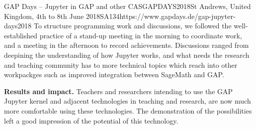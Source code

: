 \begin{event}{GAP Days -- Jupyter in GAP and other CAS}{GAPDAYS2018}{St Andrews, United Kingdom, 4th to 8th June 2018}{SA}{13}{4}{https://www.gapdays.de/gap-jupyter-days2018}
To structure programming work and discussions, we followed the well-established
practice of a stand-up meeting in the morning to coordinate work, and a meeting
in the afternoon to record achievements.
%
Discussions ranged from deepining the understanding of how Jupyter works, and
what needs the research and teaching community has to more technical topics
which reach into other workpackges such as improved integration between SageMath
and GAP.

\textbf{Results and impact.} Teachers and researchers intending to use the GAP
Jupyter kernel and adjacent technologies in teaching and research, are now much
more comfortable using these technologies. The demonstration of the
possibilities left a good impression of the potential of this technology.



\end{event}
